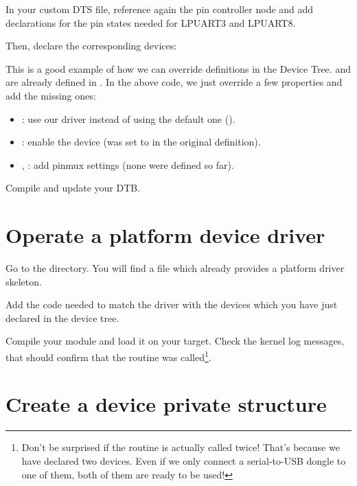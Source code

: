 {\scriptsize {}}

In your custom DTS file, reference again the pin controller node and add
declarations for the pin states needed for LPUART3 and LPUART8.

Then, declare the corresponding devices:

{\scriptsize {}}

This is a good example of how we can override definitions in the Device
Tree.  and  are already defined in
. In the above code, we
just override a few properties and add the missing ones:

\begin{itemize}
\item {}: use our driver instead of using the default one
      ().
\item {}: enable the device (was set to  in
      the original definition).
\item {}, : add pinmux settings
      (none were defined so far).
\end{itemize}

Compile and update your DTB.

\section{Operate a platform device driver}

Go to the  directory.
You will find a  file which already provides a platform
driver skeleton.

Add the code needed to match the driver with the devices which you have
just declared in the device tree.

Compile your module and load it on your target. Check the kernel log
messages, that should confirm that the  routine was
called\footnote{Don't be surprised if the  routine is
actually called twice! That's because we have declared two devices.
Even if we only connect a serial-to-USB dongle to one of them, both
of them are ready to be used!}.

\section{Create a device private structure}

